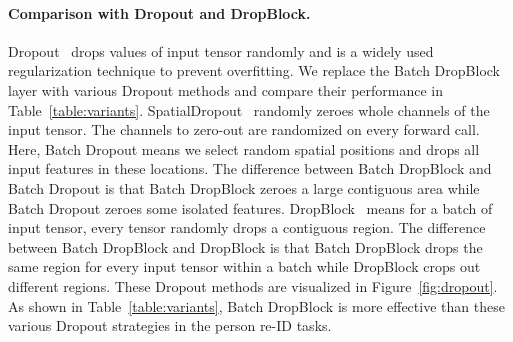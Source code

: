 \begin{table*}[!htb]
\begin{minipage}[t]{.38\linewidth}
\label{table:triplet_loss}
\end{minipage}\hfill \begin{minipage}[t]{.33\linewidth}
\vspace{-3mm}
\caption{The comparison with data augmentation methods. `RE' means Random Erasing~\cite{zhong2017random}. `Cut' means Cutout~\cite{devries2017improved}.}
\label{table:augmentation}
\end{minipage} 
\vspace{-3mm}
\end{table*}

\paragraph{Comparison with Dropout and DropBlock.}\vspace{-4mm} Dropout~\cite{srivastava2014dropout} drops values of input tensor randomly and is a widely used regularization technique to prevent overfitting. 
We replace the Batch DropBlock layer with various Dropout methods and compare their performance in Table~\ref{table:variants}. 
SpatialDropout~\cite{tompson2015efficient} randomly zeroes whole channels of the input tensor. The channels to zero-out are randomized on every forward call. 
Here, Batch Dropout means we select random spatial positions and drops all input features in these locations. The difference between Batch DropBlock and Batch Dropout is that Batch DropBlock zeroes a large contiguous area while Batch Dropout zeroes some isolated features. 
DropBlock~\cite{ghiasi2018dropblock} means for a batch of input tensor, every tensor randomly drops a contiguous region. 
The difference between Batch DropBlock and DropBlock is that Batch DropBlock drops the same region for every input tensor within a batch while DropBlock crops out different regions. These Dropout methods are visualized in Figure~\ref{fig:dropout}.
As shown in Table~\ref{table:variants}, Batch DropBlock is more effective than these various Dropout strategies in the person re-ID tasks.

